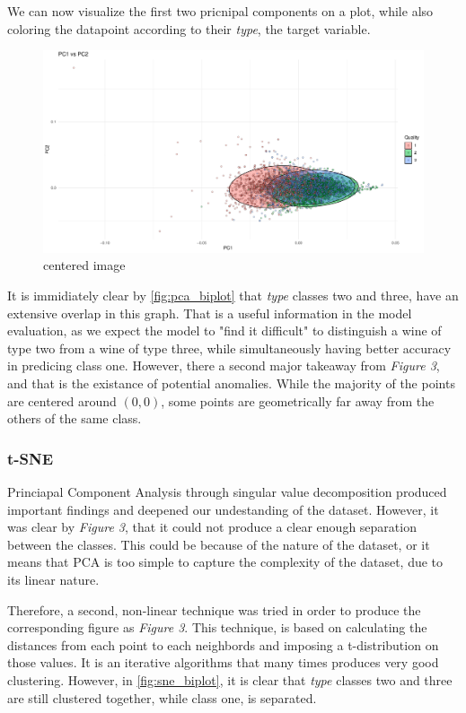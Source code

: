 \documentclass[11pt,twoside]{article}
\numberwithin{Theorem}{section}
\numberwithin{Definition}{section}
\numberwithin{Lemma}{section}
\numberwithin{Algorithm}{section}
\numberwithin{equation}{section}
\begin{document}
We can now visualize the first two pricnipal components on a plot, while also coloring the datapoint according to their \textit{type}, the target variable. 
\vspace*{1em}
\begin{figure}[!h]
\centering
\includegraphics[width=\textwidth]{./output/1.c.pca-biplot.pdf}
\caption{centered image}
\label{fig:pca_biplot}
\end{figure}
\vspace{2em}
It is immidiately clear by \autoref{fig:pca_biplot} that \textit{type} classes two and three, have an extensive overlap in this graph. That is a useful information in the model evaluation, as we expect the model to "find it difficult" to distinguish a wine of type two from a wine of type three, while simultaneously having better accuracy in predicing class one. However, there a second major takeaway from \textit{Figure 3}, and that is the existance of potential anomalies. While the majority of the points are centered around $(0,0)$, some points are geometrically far away from the others of the same class. 

\subsubsection{t-SNE}
\label{sec:tsne}

Princiapal Component Analysis through singular value decomposition produced important findings and deepened our undestanding of the dataset. However, it was clear by \textit{Figure 3}, that it could not produce a clear enough separation between the classes. This could be because of the nature of the dataset, or it means that PCA is too simple to capture the complexity of the dataset, due to its linear nature. 

Therefore, a second, non-linear technique was tried in order to produce the corresponding figure as \textit{Figure 3}. This technique, is based on calculating the distances from each point to each neighbords and imposing a t-distribution on those values. It is an iterative algorithms that many times produces very good clustering.  However, in \autoref{fig:sne_biplot}, it is clear that \textit{type} classes two and three are still clustered together, while class one, is separated. 
\end{document}
